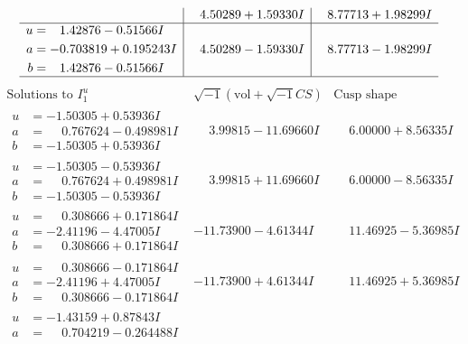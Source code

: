\documentclass[1p]{elsarticle_modified}
\theoremstyle{definition}
\newcommand{\I}{\sqrt{-1}}
\begin{document}
$$\begin{array}{c|c|c}
 & \phantom{-}4.50289 + 1.59330 I & \phantom{-}8.77713 + 1.98299 I \\ \hline\begin{aligned}
u &= \phantom{-}1.42876 - 0.51566 I \\
a &= -0.703819 + 0.195243 I \\
b &= \phantom{-}1.42876 - 0.51566 I\end{aligned}
 & \phantom{-}4.50289 - 1.59330 I & \phantom{-}8.77713 - 1.98299 I\\
 \hline 
 \end{array}$$\newpage$$\begin{array}{c|c|c}  
\text{Solutions to }I^u_{1}& \I (\text{vol} + \sqrt{-1}CS) & \text{Cusp shape}\\
 \hline 
\begin{aligned}
u &= -1.50305 + 0.53936 I \\
a &= \phantom{-}0.767624 - 0.498981 I \\
b &= -1.50305 + 0.53936 I\end{aligned}
 & \phantom{-}3.99815 - 11.69660 I & \phantom{-}6.00000 + 8.56335 I \\ \hline\begin{aligned}
u &= -1.50305 - 0.53936 I \\
a &= \phantom{-}0.767624 + 0.498981 I \\
b &= -1.50305 - 0.53936 I\end{aligned}
 & \phantom{-}3.99815 + 11.69660 I & \phantom{-}6.00000 - 8.56335 I \\ \hline\begin{aligned}
u &= \phantom{-}0.308666 + 0.171864 I \\
a &= -2.41196 - 4.47005 I \\
b &= \phantom{-}0.308666 + 0.171864 I\end{aligned}
 & -11.73900 - 4.61344 I & \phantom{-}11.46925 - 5.36985 I \\ \hline\begin{aligned}
u &= \phantom{-}0.308666 - 0.171864 I \\
a &= -2.41196 + 4.47005 I \\
b &= \phantom{-}0.308666 - 0.171864 I\end{aligned}
 & -11.73900 + 4.61344 I & \phantom{-}11.46925 + 5.36985 I \\ \hline\begin{aligned}
u &= -1.43159 + 0.87843 I \\
a &= \phantom{-}0.704219 - 0.264488 I \\

\end{aligned}
\end{array}$$
\end{document}
